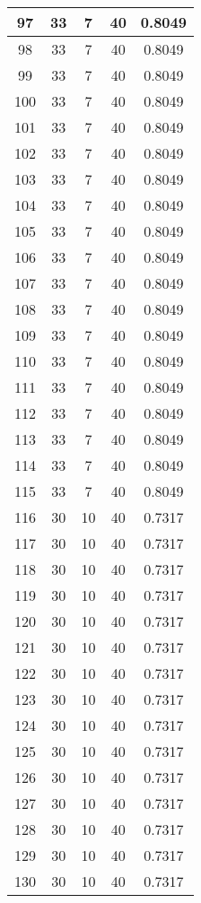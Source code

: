 \documentclass[letterpaper, 12pt]{article}
\begin{document}
\begin{longtable}{|c|c|c|c|c|}
\hline
97 & 33 & 7 & 40 & 0.8049 \\
\hline
98 & 33 & 7 & 40 & 0.8049 \\
\hline
99 & 33 & 7 & 40 & 0.8049 \\
\hline
100 & 33 & 7 & 40 & 0.8049 \\
\hline
101 & 33 & 7 & 40 & 0.8049 \\
\hline
102 & 33 & 7 & 40 & 0.8049 \\
\hline
103 & 33 & 7 & 40 & 0.8049 \\
\hline
104 & 33 & 7 & 40 & 0.8049 \\
\hline
105 & 33 & 7 & 40 & 0.8049 \\
\hline
106 & 33 & 7 & 40 & 0.8049 \\
\hline
107 & 33 & 7 & 40 & 0.8049 \\
\hline
108 & 33 & 7 & 40 & 0.8049 \\
\hline
109 & 33 & 7 & 40 & 0.8049 \\
\hline
110 & 33 & 7 & 40 & 0.8049 \\
\hline
111 & 33 & 7 & 40 & 0.8049 \\
\hline
112 & 33 & 7 & 40 & 0.8049 \\
\hline
113 & 33 & 7 & 40 & 0.8049 \\
\hline
114 & 33 & 7 & 40 & 0.8049 \\
\hline
115 & 33 & 7 & 40 & 0.8049 \\
\hline
116 & 30 & 10 & 40 & 0.7317 \\
\hline
117 & 30 & 10 & 40 & 0.7317 \\
\hline
118 & 30 & 10 & 40 & 0.7317 \\
\hline
119 & 30 & 10 & 40 & 0.7317 \\
\hline
120 & 30 & 10 & 40 & 0.7317 \\
\hline
121 & 30 & 10 & 40 & 0.7317 \\
\hline
122 & 30 & 10 & 40 & 0.7317 \\
\hline
123 & 30 & 10 & 40 & 0.7317 \\
\hline
124 & 30 & 10 & 40 & 0.7317 \\
\hline
125 & 30 & 10 & 40 & 0.7317 \\
\hline
126 & 30 & 10 & 40 & 0.7317 \\
\hline
127 & 30 & 10 & 40 & 0.7317 \\
\hline
128 & 30 & 10 & 40 & 0.7317 \\
\hline
129 & 30 & 10 & 40 & 0.7317 \\
\hline
130 & 30 & 10 & 40 & 0.7317 \\

\end{longtable}
\end{document}
